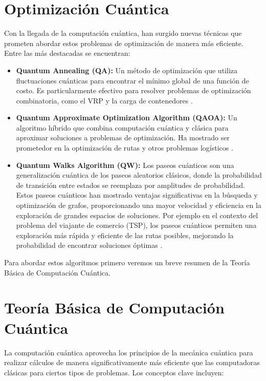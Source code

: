 \documentclass[11pt,a4paper,spanish]{book}
\begin{document}
\section{Optimización Cuántica}

Con la llegada de la computación cuántica, han surgido nuevas técnicas que prometen abordar estos problemas de optimización de manera más eficiente. Entre las más destacadas se encuentran:

\begin{itemize}
	\item \textbf{Quantum Annealing (QA):} Un método de optimización que utiliza fluctuaciones cuánticas para encontrar el mínimo global de una función de costo. Es particularmente efectivo para resolver problemas de optimización combinatoria, como el VRP y la carga de contenedores \cite{phillipson2024}.
	\item \textbf{Quantum Approximate Optimization Algorithm (QAOA):} Un algoritmo híbrido que combina computación cuántica y clásica para aproximar soluciones a problemas de optimización. Ha mostrado ser prometedor en la optimización de rutas y otros problemas logísticos \cite{farhiQuantum}.
    \item \textbf{Quantum Walks Algorithm (QW):} Los paseos cuánticos son una generalización cuántica de los paseos aleatorios clásicos, donde la probabilidad de transición entre estados se reemplaza por amplitudes de probabilidad. Estos paseos cuánticos han mostrado ventajas significativas en la búsqueda y optimización de grafos, proporcionando una mayor velocidad y eficiencia en la exploración de grandes espacios de soluciones. Por ejemplo en el contexto del problema del viajante de comercio (TSP), los paseos cuánticos permiten una exploración más rápida y eficiente de las rutas posibles, mejorando la probabilidad de encontrar soluciones óptimas \cite{kempe2003}.
 
\end{itemize}

Para abordar estos algoritmos primero veremos un breve resumen de la Teoría Básica de Computación Cuántica.


\section{Teoría Básica de Computación Cuántica}

La computación cuántica aprovecha los principios de la mecánica cuántica para realizar cálculos de manera significativamente más eficiente que las computadoras clásicas para ciertos tipos de problemas. Los conceptos clave incluyen:
\end{document}
